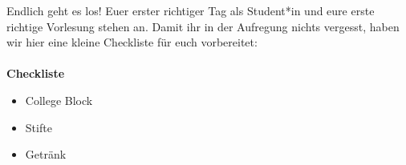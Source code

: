 Endlich geht es los! Euer erster richtiger Tag als Student*in und eure erste richtige Vorlesung stehen an. Damit ihr in der Aufregung nichts vergesst, haben wir hier eine kleine Checkliste für euch vorbereitet:\\
\\
\textbf{Checkliste}
\begin{itemize}
	\item College Block
	\item Stifte
	\item Getränk
\end{itemize}
